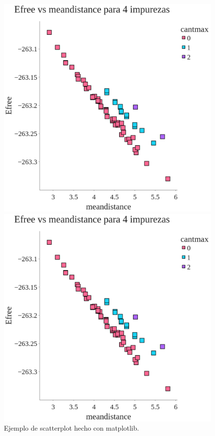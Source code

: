 \begin{figure}[H]
    \centering
    \begin{minipage}[t]{0.5\textwidth}
        \includegraphics[width=\textwidth]{images/4_impurezas_cantmax_size10.png}
    \end{minipage}%
    \begin{minipage}[t]{0.5\textwidth}
        \includegraphics[width=\textwidth]{images/4_impurezas_cantmax_size10.png}    \end{minipage}%
    \caption{Ejemplo de scatterplot hecho con matplotlib.}
    \label{fig:scatterplot_3}
\end{figure}





